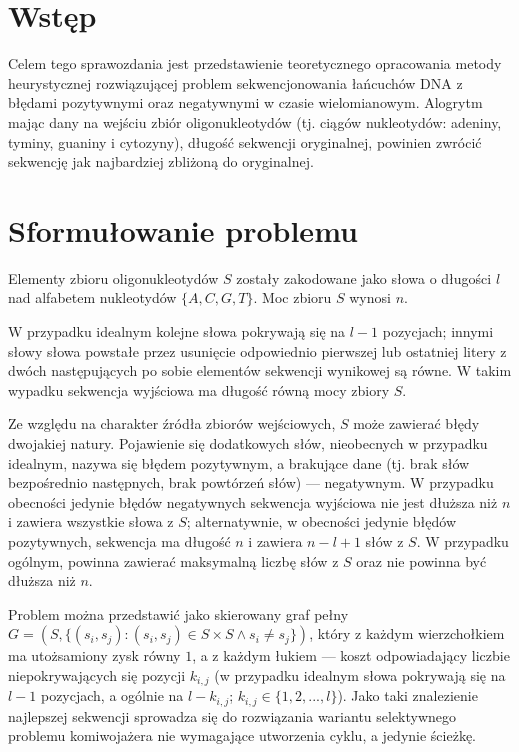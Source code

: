 \documentclass{article}
\begin{document}



\section{Wstęp}
Celem tego sprawozdania jest przedstawienie teoretycznego opracowania metody heurystycznej rozwiązującej problem sekwencjonowania łańcuchów DNA z błędami pozytywnymi oraz negatywnymi w czasie wielomianowym. Alogrytm mając dany na wejściu zbiór oligonukleotydów (tj. ciągów nukleotydów: adeniny, tyminy, guaniny i cytozyny), długość sekwencji oryginalnej, powinien zwrócić sekwencję jak najbardziej zbliżoną do oryginalnej.

\section{Sformułowanie problemu}
Elementy zbioru oligonukleotydów $S$ zostały zakodowane jako słowa o długości $l$ nad alfabetem nukleotydów $\{A, C, G, T\}$.
Moc zbioru $S$ wynosi $n$.

W przypadku idealnym kolejne słowa pokrywają się na $l-1$ pozycjach; innymi słowy słowa powstałe przez usunięcie odpowiednio pierwszej lub ostatniej litery z dwóch następujących po sobie elementów sekwencji wynikowej są równe.
W takim wypadku sekwencja wyjściowa ma długość równą mocy zbiory $S$.

Ze względu na charakter źródła zbiorów wejściowych, $S$ może zawierać błędy dwojakiej natury.
Pojawienie się dodatkowych słów, nieobecnych w przypadku idealnym, nazywa się błędem pozytywnym, a brakujące dane (tj. brak słów bezpośrednio następnych, brak powtórzeń słów) --- negatywnym.
W przypadku obecności jedynie błędów negatywnych sekwencja wyjściowa nie jest dłuższa niż $n$ i zawiera wszystkie słowa z $S$; alternatywnie, w obecności jedynie błędów pozytywnych, sekwencja ma długość $n$ i zawiera $n-l+1$ słów z $S$.
W przypadku ogólnym, powinna zawierać maksymalną liczbę słów z $S$ oraz nie powinna być dłuższa niż $n$.

Problem można przedstawić jako skierowany graf pełny $G=(S,\lbrace(s_i,s_j):(s_i,s_j)\in S\times S \land s_i\neq s_j\rbrace)$, który z każdym wierzchołkiem ma utożsamiony  zysk równy $1$, a z każdym łukiem --- koszt odpowiadający liczbie niepokrywających się pozycji $k_{i,j}$ (w przypadku idealnym słowa pokrywają się na $l-1$ pozycjach, a ogólnie na $l-k_{i,j}$; $k_{i,j}\in\lbrace1,2,...,l\rbrace$).
Jako taki znalezienie najlepszej sekwencji sprowadza się do rozwiązania wariantu selektywnego problemu komiwojażera nie wymagające utworzenia cyklu, a jedynie ścieżkę.
\end{document}
